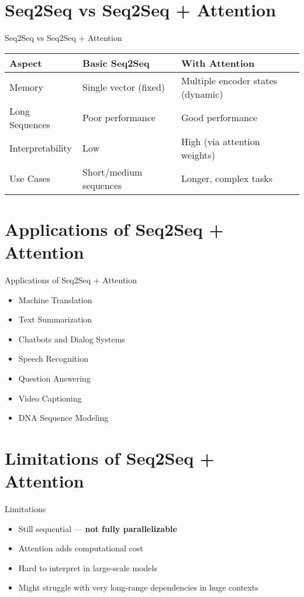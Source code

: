 \section{Seq2Seq vs Seq2Seq + Attention}
\begin{frame}{Seq2Seq vs Seq2Seq + Attention}
    \begin{table}[]
        \centering
        \begin{tabular}{|l|l|l|}
            \hline
            \textbf{Aspect} & \textbf{Basic Seq2Seq} & \textbf{With Attention} \\
            \hline
            Memory & Single vector (fixed) & Multiple encoder states (dynamic) \\
            \hline
            Long Sequences & Poor performance & Good performance \\
            \hline
            Interpretability & Low & High (via attention weights) \\
            \hline
            Use Cases & Short/medium sequences & Longer, complex tasks \\
            \hline
        \end{tabular}
    \end{table}
\end{frame}


\section{Applications of Seq2Seq + Attention}
\begin{frame}{Applications of Seq2Seq + Attention}
    \begin{itemize}
        \setlength{\itemsep}{1em}
        \item Machine Translation
        \item Text Summarization
        \item Chatbots and Dialog Systems
        \item Speech Recognition
        \item Question Answering
        \item Video Captioning
        \item DNA Sequence Modeling
    \end{itemize}
\end{frame}


\section{Limitations of Seq2Seq + Attention}
\begin{frame}{Limitations}
    \begin{itemize}
        \setlength{\itemsep}{1em}
        \item Still sequential --- \textbf{not fully parallelizable}
        \item Attention adds computational cost
        \item Hard to interpret in large-scale models
        \item Might struggle with very long-range dependencies in huge contexts
    \end{itemize}
\end{frame}


